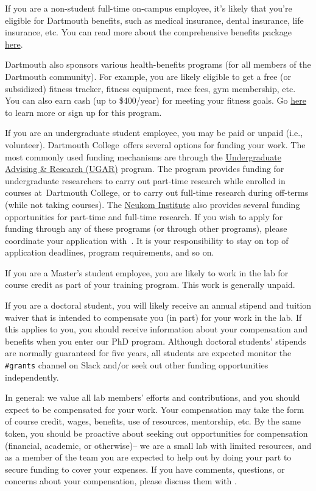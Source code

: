 \documentclass{tufte-book} %
\newcommand{\ourschool}{Dartmouth College}
\begin{document}

\noindent
If you are a non-student full-time on-campus employee, it's likely
that you're eligible for Dartmouth benefits, such as medical
insurance, dental insurance, life insurance, etc.  You can read more
about the comprehensive benefits package
\href{http://www.dartmouth.edu/~hrs/benefits/}{here}.

Dartmouth also sponsors various health-benefits programs (for all members of
the Dartmouth community). For example, you are likely eligible to get a free
(or subsidized) fitness tracker, fitness equipment, race fees, gym membership,
etc. You can also earn cash (up to \$400/year) for meeting your fitness goals.
Go \href{http://join.virginpulse.com/dartmouth/}{here} to learn more or sign up
for this program.

If you are an undergraduate student employee, you may be paid or unpaid (i.e., volunteer).
\ourschool~offers several options for funding your work. The most commonly used
funding mechanisms are through the
\href{https://students.dartmouth.edu/ugar/}{Undergraduate Advising \& Research
(UGAR)} program. The program provides funding for undergraduate researchers to
carry out part-time research while enrolled in courses at~\ourschool, or to
carry out full-time research during off-terms (while not taking courses). The
\href{https://neukom.dartmouth.edu/}{Neukom Institute} also provides several
funding opportunities for part-time and full-time research. If you wish to
apply for funding through any of these programs (or through other programs),
please coordinate your application with~\director. It is your responsibility to
stay on top of application deadlines, program requirements, and so on.

If you are a Master's student employee, you are likely to work in the lab for
course credit as part of your training program. This work is generally unpaid.

If you are a doctoral student, you will likely receive an annual stipend and
tuition waiver that is intended to compensate you (in part) for your work in
the lab. If this applies to you, you should receive information about your
compensation and benefits when you enter our PhD program. Although doctoral
students' stipends are normally guaranteed for five years, all students are
expected monitor the \texttt{\#grants} channel on Slack and/or seek out other
funding opportunities independently.

In general: we value all lab members' efforts and contributions, and you should
expect to be compensated for your work. Your compensation may take the form of
course credit, wages, benefits, use of resources, mentorship, etc. By the same
token, you should be proactive about seeking out opportunities for compensation
(financial, academic, or otherwise)-- we are a small lab with limited
resources, and as a member of the team you are expected to help out by doing
your part to secure funding to cover your expenses. If you have comments,
questions, or concerns about your compensation, please discuss them with
\director.
\end{document}
